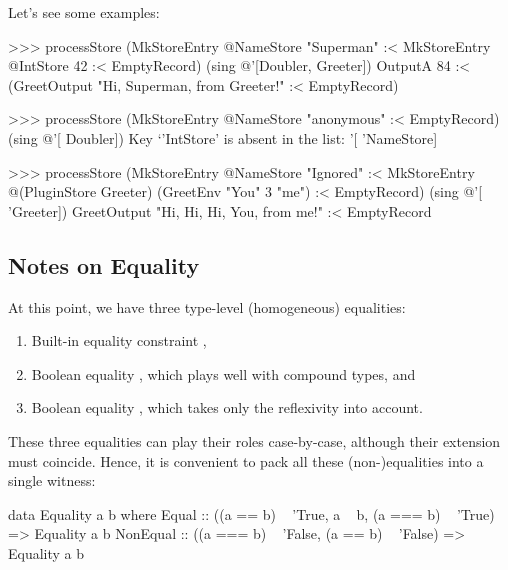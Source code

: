 \documentclass[demotion-paper.tex]{subfiles}
\begin{document}
Let's see some examples:
\begin{repl}
>>> processStore 
      (MkStoreEntry @NameStore "Superman" :< MkStoreEntry @IntStore 42
        :< EmptyRecord)
      (sing @'[Doubler, Greeter])
OutputA 84 :< (GreetOutput "Hi, Superman, from Greeter!" :< EmptyRecord)

>>> processStore (MkStoreEntry @NameStore "anonymous" :< EmptyRecord) 
      (sing @'[ Doubler])
Key `'IntStore' is absent in the list: '[ 'NameStore]

>>> processStore 
      (MkStoreEntry @NameStore "Ignored"
        :< MkStoreEntry @(PluginStore Greeter) (GreetEnv "You" 3 "me")
        :< EmptyRecord) (sing @'[ 'Greeter])
GreetOutput "Hi, Hi, Hi, You, from me!" :< EmptyRecord
\end{repl}




\subsection{Notes on Equality}
At this point, we have three type-level (homogeneous) equalities:
\begin{enumerate}
\item Built-in equality constraint ,
\item Boolean equality , which plays well with compound types, and
\item Boolean equality , which takes only the reflexivity into account.
\end{enumerate}
These three equalities can play their roles case-by-case, although their extension must coincide.
Hence, it is convenient to pack all these (non-)equalities into a single witness:

\begin{code}
data Equality a b where
  Equal :: ((a == b) ~ 'True, a ~ b, (a === b) ~ 'True) => Equality a b
  NonEqual
    :: ((a === b) ~ 'False, (a == b) ~ 'False) => Equality a b
\end{code}
\end{document}
